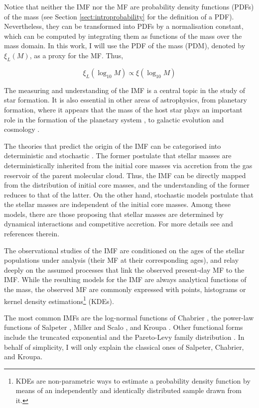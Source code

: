 Notice that neither the IMF nor the MF are probability density functions (PDFs) of the mass (see Section \ref{sect:introprobability} for the definition of a PDF). Nevertheless, they can be transformed into PDFs by a normalisation constant, which can be computed by integrating them as functions of the mass over the mass domain. In this work, I will use the PDF of the mass (PDM), denoted by $\xi_L (M)$, as a proxy for the MF. Thus,

\begin{equation}
\xi_L (\log_{10} M) \propto \xi (\log_{10} M)
\end{equation}

The measuring and understanding of the IMF is a central topic in the study of star formation. It is also essential in other areas of astrophysics, from planetary formation, where it appears that the mass of the host star plays an important role in the formation of the planetary system \cite[see for example][]{2015ApJ...814..130M}, to galactic evolution \citep{1998ASPC..142....1K} and cosmology \cite[see for example][]{2012MNRAS.423.3601N}. 

The theories that predict the origin of the IMF can be categorised into deterministic and stochastic \citep{Offner2014}. The former postulate that stellar masses are deterministically inherited from the initial core masses via accretion from the gas reservoir of the parent molecular cloud. Thus, the IMF can be directly mapped from the distribution of initial core masses, and the understanding of the former reduces to that of the latter. On the other hand, stochastic models postulate that the stellar masses are independent of the initial core masses. Among these models, there are those proposing that stellar masses are determined by dynamical interactions and competitive accretion. For more details see \citet{Offner2014} and references therein. 

  The observational studies of the IMF are conditioned on the ages of the stellar populations under analysis (their MF at their corresponding ages), and relay deeply on the assumed processes that link the observed present-day MF to the IMF. While the resulting models for the IMF are always analytical functions of the mass, the observed MF are commonly expressed with points, histograms or kernel density estimations\footnote{KDEs are non-parametric ways to estimate a probability density function by means of an independently and identically distributed sample drawn from it.} (KDEs).

The most common IMFs are the log-normal functions of Chabrier \citep{Chabrier2003,Chabrier2005}, the power-law functions of Salpeter \citep{Salpeter1955}, Miller and Scalo \citep{1979ApJS...41..513M}, and Kroupa \citep{2001MNRAS.322..231K,2002Sci...295...82K,2013pss5.book..115K,Thies2007,2008MNRAS.390.1200T}. Other functional forms include the truncated exponential \citep{2001AGM....18S0551D} and the Pareto-Levy family distribution \citep{2012MNRAS.423.1018C}. In behalf of simplicity, I will only explain the classical ones of Salpeter, Chabrier, and Kroupa.

